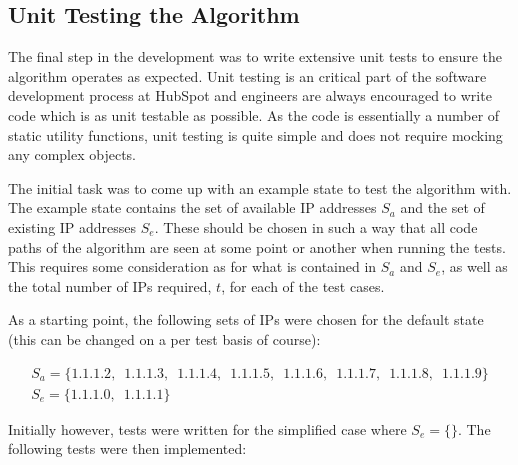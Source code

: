 \break

\subsection{Unit Testing the Algorithm}
The final step in the development was to write extensive unit tests to ensure the algorithm operates as expected. Unit testing is an critical part of the software development process at HubSpot and engineers are always encouraged to write code which is as unit testable as possible. As the code is essentially a number of static utility functions, unit testing is quite simple and does not require mocking any complex objects.  

The initial task was to come up with an example state to test the algorithm with. The example state contains the set of available IP addresses $S_a$ and the set of existing IP addresses $S_e$. These should be chosen in such a way that all code paths of the algorithm are seen at some point or another when running the tests. This requires some consideration as for what is contained in $S_a$ and $S_e$, as well as the total number of IPs required, $t$, for each of the test cases.

As a starting point, the following sets of IPs were chosen for the default state (this can be changed on a per test basis of course):

\begin{equation}\label{eq:initialState}
\begin{gathered}
S_a = \{1.1.1.2,\enspace1.1.1.3,\enspace1.1.1.4,\enspace1.1.1.5,\enspace1.1.1.6,\enspace1.1.1.7,\enspace1.1.1.8,\enspace1.1.1.9\} \\
S_e = \{1.1.1.0,\enspace1.1.1.1\}
\end{gathered}
\end{equation}

Initially however, tests were written for the simplified case where $S_e = \{\}$. The following tests were then implemented:

